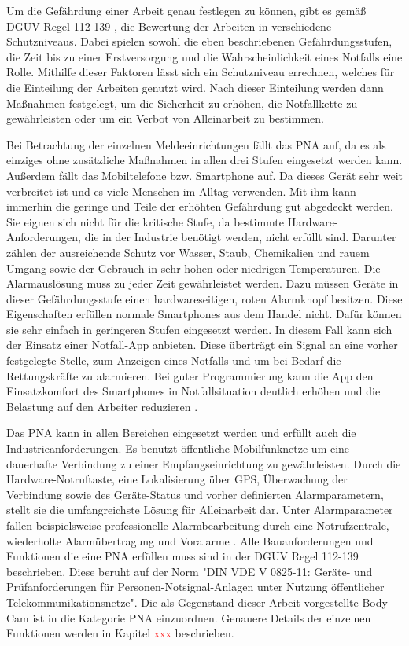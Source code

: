 \documentclass[thesis.tex]{subfiles}
\begin{document}
Um die Gefährdung einer Arbeit genau festlegen zu können, gibt es gemäß DGUV Regel 112-139 \cite[]{Regel_112-139}, die Bewertung der Arbeiten in verschiedene Schutzniveaus.
Dabei spielen sowohl die eben beschriebenen Gefährdungsstufen, die Zeit bis zu einer Erstversorgung und die Wahrscheinlichkeit eines Notfalls eine Rolle.
Mithilfe dieser Faktoren lässt sich ein Schutzniveau errechnen, welches für die Einteilung der Arbeiten genutzt wird.
Nach dieser Einteilung werden dann Maßnahmen festgelegt, um die Sicherheit zu erhöhen, die Notfallkette zu gewährleisten oder um ein Verbot von Alleinarbeit zu bestimmen.

Bei Betrachtung der einzelnen Meldeeinrichtungen fällt das PNA auf, da es als einziges ohne zusätzliche Maßnahmen in allen drei Stufen eingesetzt werden kann.
Außerdem fällt das Mobiltelefone bzw. Smartphone auf.
Da dieses Gerät sehr weit verbreitet ist und es viele Menschen im Alltag verwenden.
Mit ihm kann immerhin die geringe und Teile der erhöhten Gefährdung gut abgedeckt werden.
Sie eignen sich nicht für die kritische Stufe, da bestimmte Hardware-Anforderungen, die in der Industrie benötigt werden, nicht erfüllt sind.
Darunter zählen der ausreichende Schutz vor Wasser, Staub, Chemikalien und rauem Umgang sowie der Gebrauch in sehr hohen oder niedrigen Temperaturen.
Die Alarmauslösung muss zu jeder Zeit gewährleistet werden.
Dazu müssen Geräte in dieser Gefährdungsstufe einen hardwareseitigen, roten Alarmknopf besitzen.
Diese Eigenschaften erfüllen normale Smartphones aus dem Handel nicht.
Dafür können sie sehr einfach in geringeren Stufen eingesetzt werden.
In diesem Fall kann sich der Einsatz einer Notfall-App anbieten.
Diese überträgt ein Signal an eine vorher festgelegte Stelle, zum Anzeigen eines Notfalls und um bei Bedarf die Rettungskräfte zu alarmieren.
Bei guter Programmierung kann die App den Einsatzkomfort des Smartphones in Notfallsituation deutlich erhöhen und die Belastung auf den Arbeiter reduzieren \cite[vgl. S.2-5]{FAQ-PNAuAPP}.

Das PNA kann in allen Bereichen eingesetzt werden und erfüllt auch die Industrieanforderungen.
Es benutzt öffentliche Mobilfunknetze um eine dauerhafte Verbindung zu einer Empfangseinrichtung zu gewährleisten.
Durch die Hardware-Notruftaste, eine Lokalisierung über GPS, Überwachung der Verbindung sowie des Geräte-Status und vorher definierten Alarmparametern, stellt sie die umfangreichste Lösung für Alleinarbeit dar.
Unter Alarmparameter fallen beispielsweise professionelle Alarmbearbeitung durch eine Notrufzentrale, wiederholte Alarmübertragung und Voralarme \cite[vgl. S.2-5]{FAQ-PNAuAPP}.
Alle Bauanforderungen und Funktionen die eine PNA erfüllen muss sind in der DGUV Regel 112-139 \cite[]{Regel_112-139} beschrieben.
Diese beruht auf der Norm "DIN VDE V 0825-11: Geräte- und Prüfanforderungen für Personen-Notsignal-Anlagen unter Nutzung öffentlicher Telekommunikationsnetze".
Die als Gegenstand dieser Arbeit vorgestellte Body-Cam ist in die Kategorie PNA einzuordnen.
Genauere Details der einzelnen Funktionen werden in Kapitel \textcolor{red}{xxx} beschrieben.
\\
\end{document}

